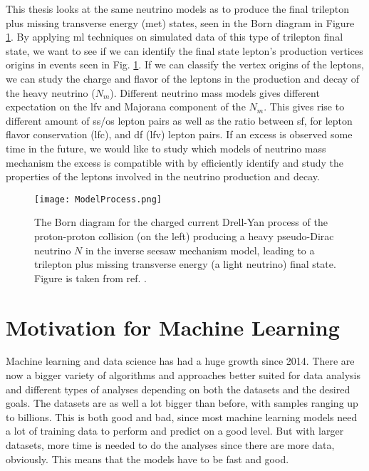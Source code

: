 \documentclass[a4paper, american, 12pt]{report}
\begin{document}
	This thesis looks at the same neutrino models as \citet{inverseseesaw} to produce the final trilepton plus missing transverse energy (\acrshort{met}) states, seen in the Born diagram in Figure \ref{fig:ModelProcessIntro}. By applying \acrshort{ml} techniques on simulated data of this type of trilepton final state, we want to see if we can identify the final state lepton's production vertices origins in events seen in Fig. \ref{fig:ModelProcessIntro}. If we can classify the vertex origins of the leptons, we can study the charge and flavor of the leptons in the production and decay of the heavy neutrino ($N_m$). Different neutrino mass models gives different expectation on the \acrshort{lfv} and Majorana component of the $N_m$. This gives rise to different amount of \acrshort{ss}/\acrshort{os} lepton pairs as well as the ratio between \acrshort{sf}, for lepton flavor conservation (\acrshort{lfc}), and \acrshort{df} (\acrshort{lfv}) lepton pairs. If an excess is observed some time in the future, we would like to study which models of neutrino mass mechanism the excess is compatible with by efficiently identify and study the properties of the leptons involved in the neutrino production and decay.
	\begin{figure}[htbp!]
		\hspace*{-1.0cm}
		\centering\texttt{[image: ModelProcess.png]}
		\caption[The charged current Drell-Yan process.]{The Born diagram for the charged current Drell-Yan process of the proton-proton collision (on the left) producing a heavy pseudo-Dirac neutrino $N$ in the inverse seesaw mechanism model, leading to a trilepton plus missing transverse energy (a light neutrino) final state. Figure is taken from ref. \cite{inverseseesaw}. \label{fig:ModelProcessIntro}}
	\end{figure} 

	
	\section{Motivation for Machine Learning}
	\label{sect:Intro-Motivation}
	Machine learning and data science has had a huge growth since 2014. There are now a bigger variety of algorithms and approaches better suited for data analysis and different types of analyses depending on both the datasets and the desired goals. The datasets are as well a lot bigger than before, with samples ranging up to billions. This is both good and bad, since most machine learning models need a lot of training data to perform and predict on a good level. But with larger datasets, more time is needed to do the analyses since there are more data, obviously. This means that the models have to be fast and good.
	
\end{document}
